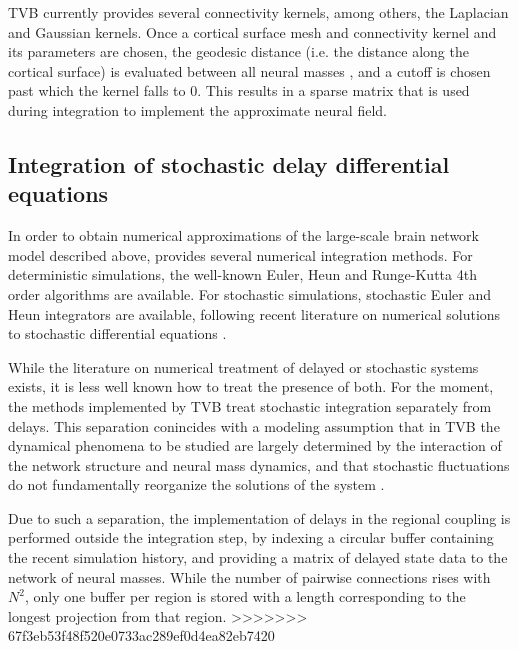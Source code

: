     TVB currently provides several connectivity kernels, among others, 
    the Laplacian and Gaussian kernels. Once a cortical surface mesh 
    and connectivity kernel and its parameters are chosen, the geodesic
    distance (i.e. the distance along the cortical surface) is evaluated
    between all neural masses \cite{Mitchell1987}, and a cutoff is chosen
    past which the kernel falls to 0. This results in a sparse matrix that 
    is used during integration to implement the approximate neural field. 

\subsection{Integration of stochastic delay differential equations}

    In order to obtain numerical approximations of the large-scale brain network model 
    described above, \TVB provides several numerical integration methods. For
    deterministic simulations, the well-known Euler, 
    Heun and Runge-Kutta 4th order 
    algorithms are available. For stochastic
    simulations, stochastic Euler and Heun integrators are available, 
    following recent literature on numerical solutions to stochastic
    differential equations \cite{Kloeden_1995,Mannella_2002,Mannella_1989}.

    While the literature on numerical treatment of delayed or 
    stochastic systems exists, it is less well known how to treat 
    the presence of both. For the moment, the methods implemented by TVB
    treat stochastic integration separately from delays. 
    This separation conincides with a modeling assumption that in
    TVB the dynamical phenomena to be studied are largely determined
    by the interaction of the network structure and neural mass dynamics, 
    and that stochastic fluctuations do not fundamentally reorganize the
    solutions of the system \cite{Ghosh_2008,Deco_2009,Deco_2011,Deco_Senden_2012}.

    Due to such a separation, the implementation of delays in the
    regional coupling is performed outside the integration step,
    by indexing a circular buffer containing the recent simulation 
    history, and providing a matrix of delayed state data to the 
    network of neural masses. While the number of pairwise
    connections rises with $N^2$, only one buffer per region 
    is stored with a length corresponding to the longest projection
    from that region.
>>>>>>> 67f3eb53f48f520e0733ac289ef0d4ea82eb7420

